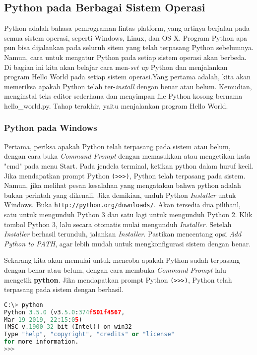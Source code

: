 \subsection{Python pada Berbagai Sistem Operasi}

Python adalah bahasa pemrograman lintas platform, yang artinya berjalan pada semua sistem operasi, seperti Windows, Linux, dan OS X. Program Python apa pun bisa dijalankan pada seluruh sitem yang telah terpasang Python sebelumnya. Namun, cara untuk mengatur Python pada setiap sistem operasi akan berbeda. Di bagian ini kita akan belajar cara men-\textit{set up} Python dan menjalankan program Hello World pada setiap sistem operasi.Yang pertama adalah, kita akan memeriksa apakah Python telah ter-\textit{install} dengan benar atau belum. Kemudian, menginstal teks editor sederhana dan menyimpan file Python kosong bernama hello\_world.py. Tahap terakhir, yaitu menjalankan program Hello World.
\subsubsection{Python pada Windows}

Pertama, periksa apakah Python telah terpasang pada sistem atau belum, dengan cara buka \textit{Command Prompt} dengan memasukkan atau mengetikan kata "cmd" pada menu Start. Pada jendela terminal, ketikan python dalam huruf kecil. Jika mendapatkan prompt Python \verb|(>>>)|, Python telah terpasang pada sistem. Namun, jika melihat pesan kesalahan yang mengatakan bahwa python adalah  bukan perintah yang dikenali.
Jika demikian, unduh Python \textit{Installer} untuk Windows. Buka \verb|http://python.org/downloads/|. Akan tersedia dua pilihanl, satu untuk mengunduh Python 3 dan satu lagi untuk mengunduh Python 2. Klik tombol Python 3, lalu secara otomatis mulai mengunduh \textit{Installer}. Setelah \textit{Installer} berhasil terunduh, jalankan \textit{Installer}. Pastikan mencentang opsi \textit{Add Python to PATH}, agar lebih mudah untuk mengkonfigurasi sistem dengan benar.

Sekarang kita akan memulai untuk mencoba apakah Python sudah terpasang dengan benar atau belum, dengan cara membuka \textit{Command Prompt} lalu mengetik \textbf{python}. Jika mendapatkan prompt Python \verb|(>>>)|, Python telah terpasang pada sistem dengan berhasil. 
\begin{lstlisting}[language=Python, label={lst:success}, caption=Python Yang Telah Terpasang]
C:\> python
Python 3.5.0 (v3.5.0:374f501f4567,
Mar 19 2019, 22:15:05)
[MSC v.1900 32 bit (Intel)] on win32
Type "help", "copyright", "credits" or "license"
for more information.
>>>
\end{lstlisting}

